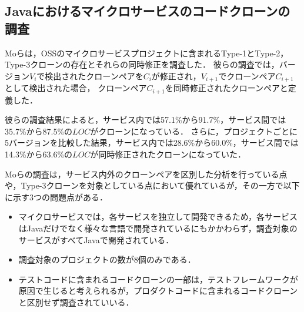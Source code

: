 \documentclass[T,J]{fose}
\begin{document}
\subsection{Javaにおけるマイクロサービスのコードクローンの調査}

Moらは，OSSのマイクロサービスプロジェクトに含まれるType-1とType-2，Type-3クローンの存在とそれらの同時修正を調査した\cite{mo2021existence}．
彼らの調査では，バージョン$V_i$で検出されたクローンペアを$C_i$が修正され，$V_{i+1}$でクローンペア$C_{i+1}$として検出された場合，
クローンペア$C_{i+1}$を同時修正されたクローンペアと定義した．

彼らの調査結果によると，サービス内では57.1\%から91.7\%，サービス間では35.7\%から87.5\%の$LOC$がクローンになっている．
さらに，プロジェクトごとに5バージョンを比較した結果，サービス内では28.6\%から60.0\%，サービス間では14.3\%から63.6\%の$LOC$が同時修正されたクローンになっていた．

Moらの調査は，サービス内外のクローンペアを区別した分析を行っている点や，Type-3クローンを対象としている点において優れているが，その一方で以下に示す3つの問題点がある．
\begin{itemize}
    \item マイクロサービスでは，各サービスを独立して開発できるため，各サービスはJavaだけでなく様々な言語で開発されているにもかかわらず，調査対象のサービスがすべてJavaで開発されている．
    \item 調査対象のプロジェクトの数が8個のみである．
    \item テストコードに含まれるコードクローンの一部は，テストフレームワークが原因で生じると考えられるが，プロダクトコードに含まれるコードクローンと区別せず調査されていいる．
\end{itemize}
\end{document}

